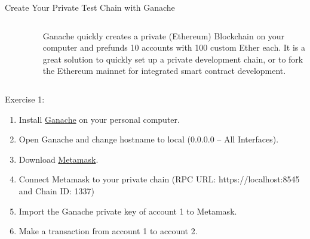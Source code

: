 \documentclass[]{beamer}
\begin{document}
\begin{frame}{Create Your Private Test Chain with Ganache}

	\begin{columns}
		\begin{column}{0.15\textwidth}
			\begin{figure}
				\includegraphics[width = \textwidth]{../assets/images/logo_ganache.png}
			\end{figure}
		\end{column}
		\begin{column}{0.85\textwidth}
			Ganache quickly creates a private (Ethereum) Blockchain on your computer and prefunds 10 accounts with 100 custom Ether each. It is a great solution to quickly set up a private development chain, or to fork the Ethereum mainnet for integrated smart contract development.
		\end{column}
	\end{columns}
	\vspace{1em}
	\begin{exercise}{Exercise 1:}
		\begin{enumerate}
			\item Install \href{https://www.trufflesuite.com/ganache}{\link Ganache} on your personal computer.
			\item Open Ganache and change hostname to local (0.0.0.0 -- All Interfaces).
			\item Download \href{https://metamask.io/}{\link Metamask}.
			\item Connect Metamask to your private chain (RPC URL: https://localhost:8545 and Chain ID: 1337)
			\item Import the Ganache private key of account 1 to Metamask.
			\item Make a transaction from account 1 to account 2.
		\end{enumerate}
	\end{exercise}
\end{frame}
\end{document}
